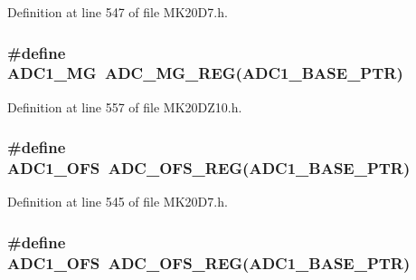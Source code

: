 Definition at line 547 of file M\+K20\+D7.\+h.

\subsubsection[{\texorpdfstring{A\+D\+C1\+\_\+\+MG}{ADC1_MG}}]{\setlength{\rightskip}{0pt plus 5cm}\#define A\+D\+C1\+\_\+\+MG~{\bf A\+D\+C\+\_\+\+M\+G\+\_\+\+R\+EG}({\bf A\+D\+C1\+\_\+\+B\+A\+S\+E\+\_\+\+P\+TR})}\hypertarget{group___a_d_c___register___accessor___macros_ga96f53fc22e1488ac9acdbfb9f291dcff}{}\label{group___a_d_c___register___accessor___macros_ga96f53fc22e1488ac9acdbfb9f291dcff}


Definition at line 557 of file M\+K20\+D\+Z10.\+h.

\subsubsection[{\texorpdfstring{A\+D\+C1\+\_\+\+O\+FS}{ADC1_OFS}}]{\setlength{\rightskip}{0pt plus 5cm}\#define A\+D\+C1\+\_\+\+O\+FS~{\bf A\+D\+C\+\_\+\+O\+F\+S\+\_\+\+R\+EG}({\bf A\+D\+C1\+\_\+\+B\+A\+S\+E\+\_\+\+P\+TR})}\hypertarget{group___a_d_c___register___accessor___macros_gacd6ca988aa9514cad8a02e6a2fab975c}{}\label{group___a_d_c___register___accessor___macros_gacd6ca988aa9514cad8a02e6a2fab975c}


Definition at line 545 of file M\+K20\+D7.\+h.

\subsubsection[{\texorpdfstring{A\+D\+C1\+\_\+\+O\+FS}{ADC1_OFS}}]{\setlength{\rightskip}{0pt plus 5cm}\#define A\+D\+C1\+\_\+\+O\+FS~{\bf A\+D\+C\+\_\+\+O\+F\+S\+\_\+\+R\+EG}({\bf A\+D\+C1\+\_\+\+B\+A\+S\+E\+\_\+\+P\+TR})}\hypertarget{group___a_d_c___register___accessor___macros_gacd6ca988aa9514cad8a02e6a2fab975c}{}\label{group___a_d_c___register___accessor___macros_gacd6ca988aa9514cad8a02e6a2fab975c}


